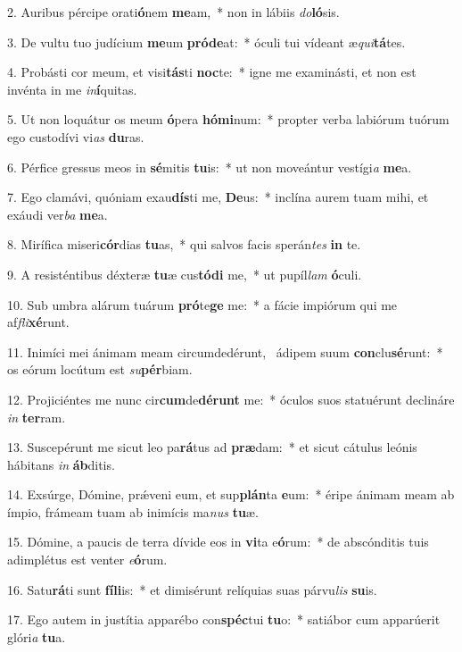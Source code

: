 2. Auribus pércipe orati\textbf{ó}nem \textbf{me}am,~*  non in lábiis \textit{do}\textbf{ló}sis.\

3. De vultu tuo judícium \textbf{me}um \textbf{pród}\textbf{e}at:~*  óculi tui vídeant æ\textit{qui}\textbf{tá}tes.\

4. Probásti cor meum, et visi\textbf{tás}ti \textbf{noc}te:~*  igne me examinásti, et non est invénta in me \textit{in}\textbf{í}quitas.\

5. Ut non loquátur os meum \textbf{ó}pera \textbf{hó}\textbf{mi}num:~*  propter verba labiórum tuórum ego custodívi vi\textit{as} \textbf{du}ras.\

6. Pérfice gressus meos in \textbf{sé}mitis \textbf{tu}is:~*  ut non moveántur vestígi\textit{a} \textbf{me}a.\

7. Ego clamávi, quóniam exau\textbf{dís}ti me, \textbf{De}us:~*  inclína aurem tuam mihi, et exáudi ver\textit{ba} \textbf{me}a.\

8. Mirífica miseri\textbf{cór}dias \textbf{tu}as,~*  qui salvos facis sperán\textit{tes} \textbf{in} te.\

9. A resisténtibus déxteræ \textbf{tu}æ cus\textbf{tó}\textbf{di} me,~*  ut pupíl\textit{lam} \textbf{ó}culi.\

10. Sub umbra alárum tuárum \textbf{pró}te\textbf{ge} me:~*  a fácie impiórum qui me af\textit{fli}\textbf{xé}runt.\

11. Inimíci mei ánimam meam circumdedérunt, \dag\  ádipem suum \textbf{con}clu\textbf{sé}runt:~*  os eórum locútum est \textit{su}\textbf{pér}biam.\

12. Projiciéntes me nunc cir\textbf{cum}de\textbf{dé}\textbf{runt} me:~*  óculos suos statuérunt declináre \textit{in} \textbf{ter}ram.\

13. Suscepérunt me sicut leo pa\textbf{rá}tus ad \textbf{præ}dam:~*  et sicut cátulus leónis hábitans \textit{in} \textbf{áb}ditis.\

14. Exsúrge, Dómine, prǽveni eum, et sup\textbf{plán}ta \textbf{e}um:~*  éripe ánimam meam ab ímpio, frámeam tuam ab inimícis ma\textit{nus} \textbf{tu}æ.\

15. Dómine, a paucis de terra dívide eos in \textbf{vi}ta e\textbf{ó}rum:~*  de abscónditis tuis adimplétus est venter \textit{e}\textbf{ó}rum.\

16. Satu\textbf{rá}ti sunt \textbf{fí}\textbf{li}is:~*  et dimisérunt relíquias suas párvu\textit{lis} \textbf{su}is.\

17. Ego autem in justítia apparébo con\textbf{spéc}tui \textbf{tu}o:~*  satiábor cum apparúerit glóri\textit{a} \textbf{tu}a.\


